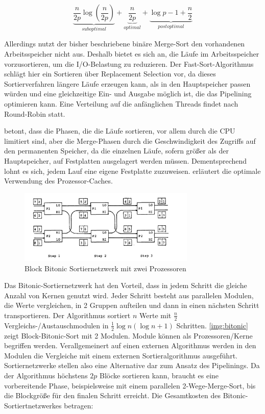 \documentclass[a4paper,12pt,twoside]{article}
\begin{document}
\[ \underbrace{\frac{n}{2p} \log \left( \frac{n}{2p} \right)}_{suboptimal} + \underbrace{\frac{n}{2p}}_{optimal} + \underbrace{\log p - 1 + \frac{n}{2}}_{postoptimal} \]

Allerdings nutzt der bisher beschriebene binäre Merge-Sort den vorhandenen Arbeitsspeicher nicht aus. Deshalb bietet es sich an, die Läufe im Arbeitsspeicher vorzusortieren, um die I/O-Belastung zu reduzieren. Der Fast-Sort-Algorithmus \parencite{Tsukerman1986, Salzberg1990} schlägt hier ein Sortieren über Replacement Selection \parencite[vgl.][]{Knuth1973} vor, da dieses Sortierverfahren längere Läufe erzeugen kann, als in den Hauptspeicher passen würden und eine gleichzeitige Ein- und Ausgabe möglich ist, die das Pipelining optimieren kann. Eine Verteilung auf die anfänglichen Threads findet nach Round-Robin statt.

\textcite{Salzberg1990} betont, dass die Phasen, die die Läufe sortieren, vor allem durch die CPU limitiert sind, aber die Merge-Phasen durch die Geschwindigkeit des Zugriffs auf den permanenten Speicher, da die einzelnen Läufe, sofern größer als der Hauptspeicher, auf Festplatten ausgelagert werden müssen. Dementsprechend lohnt es sich, jedem Lauf eine eigene Festplatte zuzuweisen. \textcite{Hao2009} erläutert die optimale Verwendung des Prozessor-Caches.

\begin{figure}
	\centering
	\includegraphics[width=0.75\textwidth]{Bilder/bitonic_block.png}
	\caption{Block Bitonic Sortiernetzwerk mit zwei Prozessoren \autocite[S. 335]{Bitton1983}}
	\label{img:bitonic}
\end{figure}

Das Bitonic-Sortiernetzwerk {\autocite[S. 335f]{Bitton1983}} hat den Vorteil, dass in jedem Schritt die gleiche Anzahl von Kernen genutzt wird. Jeder Schritt besteht aus parallelen Modulen, die Werte vergleichen, in 2 Gruppen aufteilen und dann in einen nächsten Schritt transportieren. Der Algorithmus sortiert $n$ Werte mit $\frac {n} {2} $ Vergleichs-/Austauschmodulen in $\frac{1}{2} \log n (\log n +1)$ Schritten. \autoref{img:bitonic} zeigt Block-Bitonic-Sort mit 2 Modulen. Module können als Prozessoren/Kerne begriffen werden. Verallgemeinert auf einen externen Algorithmus werden in den Modulen die Vergleiche mit einem externen Sortieralgorithmus ausgeführt. Sortiernetzwerke stellen also eine Alternative dar zum Ansatz des Pipelinings. Da der Algorithmus höchstens $2p$ Blöcke sortieren kann, braucht es eine vorbereitende Phase, beispielsweise mit einem parallelen 2-Wege-Merge-Sort, bis die Blockgröße für den finalen Schritt erreicht. Die Gesamtkosten des Bitonic-Sortiertnetzwerkes betragen:
\end{document}
